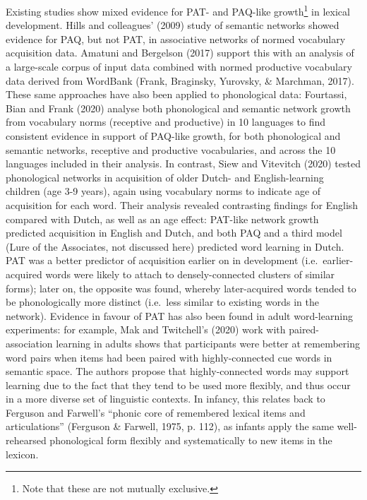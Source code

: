 \documentclass[
  man,mask,floatsintext]{apa6}
\begin{document}
Existing studies show mixed evidence for PAT- and PAQ-like growth\footnote{Note that these are not mutually exclusive.} in lexical development. Hills and colleagues' (2009) study of semantic networks showed evidence for PAQ, but not PAT, in associative networks of normed vocabulary acquisition data. Amatuni and Bergelson (2017) support this with an analysis of a large-scale corpus of input data combined with normed productive vocabulary data derived from WordBank (Frank, Braginsky, Yurovsky, \& Marchman, 2017). These same approaches have also been applied to phonological data: Fourtassi, Bian and Frank (2020) analyse both phonological and semantic network growth from vocabulary norms (receptive and productive) in 10 languages to find consistent evidence in support of PAQ-like growth, for both phonological and semantic networks, receptive and productive vocabularies, and across the 10 languages included in their analysis. In contrast, Siew and Vitevitch (2020) tested phonological networks in acquisition of older Dutch- and English-learning children (age 3-9 years), again using vocabulary norms to indicate age of acquisition for each word. Their analysis revealed contrasting findings for English compared with Dutch, as well as an age effect: PAT-like network growth predicted acquisition in English and Dutch, and both PAQ and a third model (Lure of the Associates, not discussed here) predicted word learning in Dutch. PAT was a better predictor of acquisition earlier on in development (i.e.~earlier-acquired words were likely to attach to densely-connected clusters of similar forms); later on, the opposite was found, whereby later-acquired words tended to be phonologically more distinct (i.e.~less similar to existing words in the network). Evidence in favour of PAT has also been found in adult word-learning experiments: for example, Mak and Twitchell's (2020) work with paired-association learning in adults shows that participants were better at remembering word pairs when items had been paired with highly-connected cue words in semantic space. The authors propose that highly-connected words may support learning due to the fact that they tend to be used more flexibly, and thus occur in a more diverse set of linguistic contexts. In infancy, this relates back to Ferguson and Farwell's ``phonic core of remembered lexical items and articulations'' (Ferguson \& Farwell, 1975, p. 112), as infants apply the same well-rehearsed phonological form flexibly and systematically to new items in the lexicon.
\end{document}
